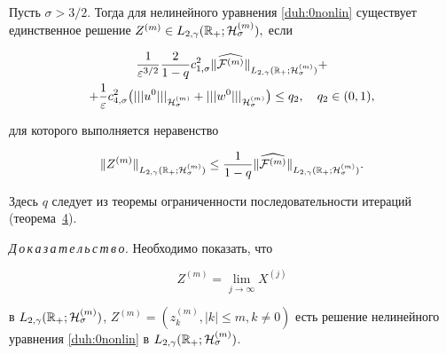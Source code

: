 \begin{theorem}[6]Пусть $\sigma>3/2.$ Тогда для нелинейного уравнения \eqref{duh:0nonlin} существует единственное решение $Z^{(m)}\in L_{2,\gamma}(\mathbb R_{+};{\cal H}^{(m)}_\sigma),$ если

\begin{multline}

\frac{1}{\varepsilon^{3/2}}\frac{2}{1-q}c^2_{1,\sigma}

\|\widehat{{\cal F}^{(m)}} \|_{L_{2,\gamma}(\mathbb R_{+};{\cal H}^{(m)}_{\sigma})}+

\\

+\frac{1}{\varepsilon}c^2_{4,\sigma}

\bigl(|||u^0|||_{{\cal H}^{(m)}_\sigma}+|||w^0|||_{{\cal H}^{(m)}_\sigma}\bigr)\le q_2,\quad q_2\in(0,1),

\end{multline}

для которого выполняется неравенство

$$

\|Z^{(m)}\|_{L_{2,\gamma}(\mathbb R_{+};{\cal H}^{(m)}_{\sigma})} 

\le \frac{1}{1-q}\| \widehat{{\cal F}^{(m)}} \|_{L_{2,\gamma}(\mathbb R_{+};{\cal H}^{(m)}_{\sigma})}.

$$

\end{theorem}



\smallskip



Здесь $q$ следует из теоремы ограниченности последовательности итераций (теорема~\hyperlink{dukh:th:4}{4}). 



\smallskip



{\it Д\,о\,к\,а\,з\,а\,т\,е\,л\,ь\,с\,т\,в\,о.} Необходимо показать, что

\begin{equation}

Z^{(m)}=\lim_{j\to \infty} X^{(j)} 

\label{duh:limit}

\end{equation}

в $L_{2,\gamma}(\mathbb R_{+};{\cal H}^{(m)}_\sigma)$, $Z^{(m)}=(z^{(m)}_k, |k|\le m, k\neq 0)$ есть решение нелинейного уравнения \eqref{duh:0nonlin} в $L_{2,\gamma}(\mathbb R_{+};{\cal H}^{(m)}_\sigma)$.



